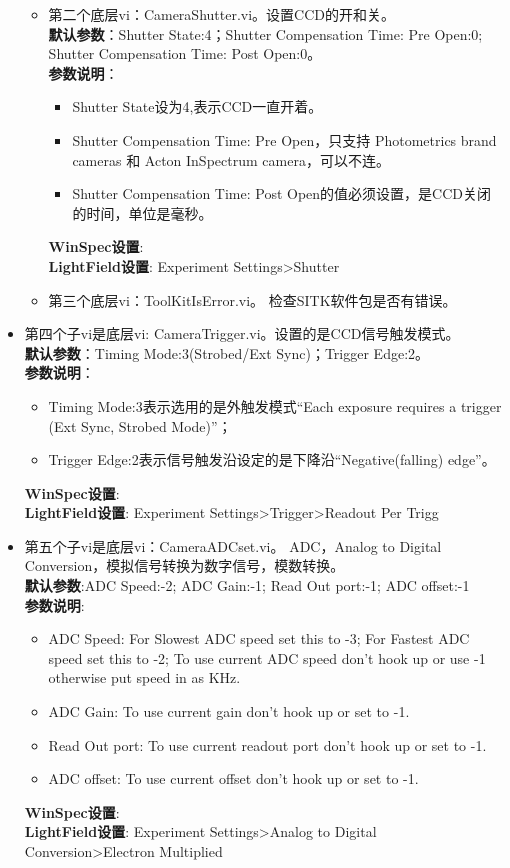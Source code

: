 \begin{itemize}
\begin{itemize}
\item 第二个底层vi：CameraShutter.vi。设置CCD的开和关。
\\\textbf{默认参数}：Shutter State:4；Shutter Compensation Time: Pre Open:0; Shutter Compensation Time: Post Open:0。
\\ \textbf{参数说明}：
\begin{itemize}
\item Shutter State设为4,表示CCD一直开着。
\item Shutter Compensation Time: Pre Open，只支持 Photometrics brand cameras 和 Acton InSpectrum camera，可以不连。
\item Shutter Compensation Time: Post Open的值必须设置，是CCD关闭的时间，单位是毫秒。
\end{itemize}
\textbf{WinSpec设置}:
\\ \textbf{LightField设置}: Experiment Settings>Shutter

\item 第三个底层vi：ToolKitIsError.vi。 检查SITK软件包是否有错误。
\end{itemize}

\item 第四个子vi是底层vi: CameraTrigger.vi。设置的是CCD信号触发模式。
\\ \textbf{默认参数}：Timing Mode:3(Strobed/Ext Sync)；Trigger Edge:2。
\\ \textbf{参数说明}：
\begin{itemize}
\item Timing Mode:3表示选用的是外触发模式“Each exposure requires a trigger (Ext Sync, Strobed Mode)”；
\item Trigger Edge:2表示信号触发沿设定的是下降沿“Negative(falling) edge”。
\end{itemize}
\textbf{WinSpec设置}:
\\ \textbf{LightField设置}: Experiment Settings>Trigger>Readout Per Trigg

\item 第五个子vi是底层vi：CameraADCset.vi。 ADC，Analog to Digital Conversion，模拟信号转换为数字信号，模数转换。
\\ \textbf{默认参数}:ADC Speed:-2; ADC Gain:-1; Read Out port:-1; ADC offset:-1
\\ \textbf{参数说明}:
\begin{itemize}
\item ADC Speed: For Slowest ADC speed set this to -3; For Fastest ADC speed set this to -2; To use current ADC speed don't hook up or use -1 otherwise put speed in as KHz.
\item ADC Gain: To use current gain don't hook up or set to -1.
\item Read Out port: To use current readout port don't hook up or set to -1.
\item ADC offset: To use current offset don't hook up or set to -1.
\end{itemize}
\textbf{WinSpec设置}:
\\ \textbf{LightField设置}: Experiment Settings>Analog to Digital Conversion>Electron Multiplied


\end{itemize}
